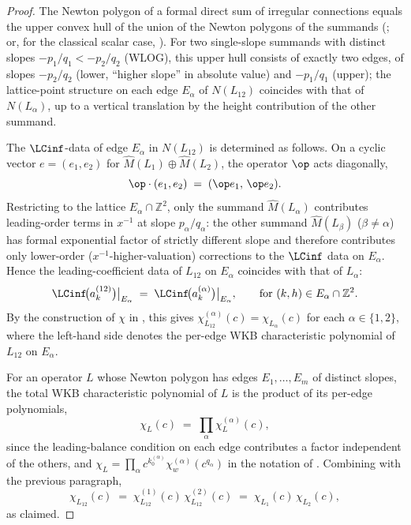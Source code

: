 \begin{proof}
The Newton polygon of a formal direct sum of irregular connections
equals the upper convex hull of the union of the Newton polygons of
the summands (\cite[Ch.~III, \S 1]{sabbah-isomon}; or, for the
classical scalar case, \cite[Ch.~II]{robba-malgrange}). For two
single-slope summands with distinct slopes $-p_1/q_1 < -p_2/q_2$
(WLOG), this upper hull consists of exactly two edges, of slopes
$-p_2/q_2$ (lower, ``higher slope'' in absolute value) and $-p_1/q_1$
(upper); the lattice-point structure on each edge $E_\alpha$ of
$N(L_{12})$ coincides with that of $N(L_\alpha)$, up to a vertical
translation by the height contribution of the other summand.

The $\LCinf$-data of edge $E_\alpha$ in $N(L_{12})$ is determined as
follows. On a cyclic vector $e = (e_1, e_2)$ for $\widehat{M}(L_1)
\oplus \widehat{M}(L_2)$, the operator $\op$ acts diagonally,
\[
   \op \cdot (e_1, e_2) \;=\; (\op e_1,\, \op e_2).
\]
Restricting to the lattice $E_\alpha \cap \mathbb{Z}^2$, only the
summand $\widehat{M}(L_\alpha)$ contributes leading-order terms in
$x^{-1}$ at slope $p_\alpha/q_\alpha$: the other summand
$\widehat{M}(L_\beta)$ ($\beta \ne \alpha$) has formal exponential
factor of strictly different slope and therefore contributes only
lower-order ($x^{-1}$-higher-valuation) corrections to the $\LCinf$
data on $E_\alpha$. Hence the leading-coefficient data of $L_{12}$ on
$E_\alpha$ coincides with that of $L_\alpha$:
\[
   \LCinf\!\big(a_k^{(12)}\big)\big|_{E_\alpha}
   \;=\;
   \LCinf\!\big(a_k^{(\alpha)}\big)\big|_{E_\alpha},
   \qquad \text{for } (k, h) \in E_\alpha \cap \mathbb{Z}^2.
\]
By the construction of $\chi$ in , this gives
$\chi^{(\alpha)}_{L_{12}}(c) = \chi_{L_\alpha}(c)$ for each
$\alpha \in \{1, 2\}$, where the left-hand side denotes the per-edge
WKB characteristic polynomial of $L_{12}$ on $E_\alpha$.

For an operator $L$ whose Newton polygon has edges $E_1, \dots, E_m$
of distinct slopes, the total WKB characteristic polynomial of $L$ is
the product of its per-edge polynomials,
\[
   \chi_L(c) \;=\; \prod_\alpha \chi_L^{(\alpha)}(c),
\]
since the leading-balance condition on each edge contributes a factor
independent of the others, and $\chi_L = \prod_\alpha c^{k_0^{(\alpha)}}
\chi_w^{(\alpha)}(c^{q_\alpha})$ in the notation of .
Combining with the previous paragraph,
\[
   \chi_{L_{12}}(c) \;=\;
   \chi^{(1)}_{L_{12}}(c)\, \chi^{(2)}_{L_{12}}(c)
   \;=\;
   \chi_{L_1}(c)\, \chi_{L_2}(c),
\]
as claimed.
\end{proof}

